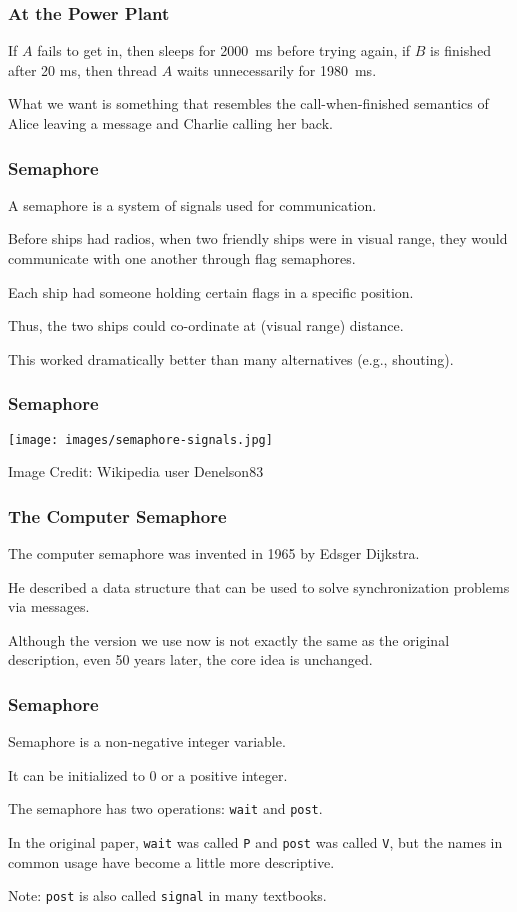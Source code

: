 \begin{frame}
	\frametitle{At the Power Plant}

	If $A$ fails to get in, then sleeps for 2000~ms before trying again, if $B$ is finished after 20 ms, then thread $A$ waits unnecessarily for 1980~ms.

	What we want is something that resembles the call-when-finished semantics of Alice leaving a message and Charlie calling her back.

\end{frame}

\begin{frame}
	\frametitle{Semaphore}

	A semaphore is a system of signals used for communication.

	Before ships had radios, when two friendly ships were in visual range, they would communicate with one another through flag semaphores.

	Each ship had someone holding certain flags in a specific position.

	Thus, the two ships could co-ordinate at (visual range) distance.

	This worked dramatically better than many alternatives (e.g., shouting).

\end{frame}


\begin{frame}
	\frametitle{Semaphore}

	\begin{center}
		\texttt{[image: images/semaphore-signals.jpg]}
	\end{center}
	{\footnotesize \hfill Image Credit: Wikipedia user Denelson83}

\end{frame}


\begin{frame}
	\frametitle{The Computer Semaphore}

	The computer semaphore was invented in 1965 by Edsger Dijkstra.

	He described a data structure that can be used to solve synchronization problems via messages.

	Although the version we use now is not exactly the same as the original description, even 50 years later, the core idea is unchanged.


\end{frame}

\begin{frame}
	\frametitle{Semaphore}

	Semaphore is a \alert{non-negative} integer variable.

	It can be initialized to 0 or a positive integer.

	The semaphore has two operations: \texttt{wait} and \texttt{post}.

	In the original paper, \texttt{wait} was called \texttt{P} and \texttt{post} was called \texttt{V}, but the names in common usage have become a little more descriptive.

	Note: \texttt{post} is also called \texttt{signal} in many textbooks.


\end{frame}

